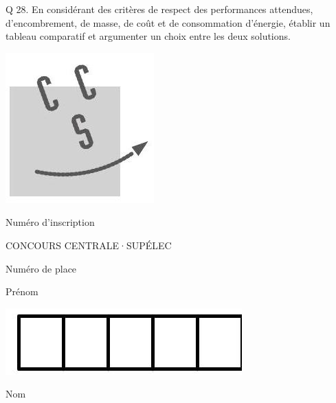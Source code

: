 \documentclass[10pt]{article}
\begin{document}
Q 28. En considérant des critères de respect des performances attendues, d'encombrement, de masse, de coût et de consommation d'énergie, établir un tableau comparatif et argumenter un choix entre les deux solutions.

\begin{center}
\includegraphics[max width=\textwidth]{2022_12_31_ed674c1a831ea1bff3a0g-12}
\end{center}

Numéro d'inscription

CONCOURS CENTRALE·SUPÉLEC

Numéro de place

Prénom

\begin{center}
\includegraphics[max width=\textwidth]{2022_12_31_ed674c1a831ea1bff3a0g-12(1)}
\end{center}

Nom
\end{document}
